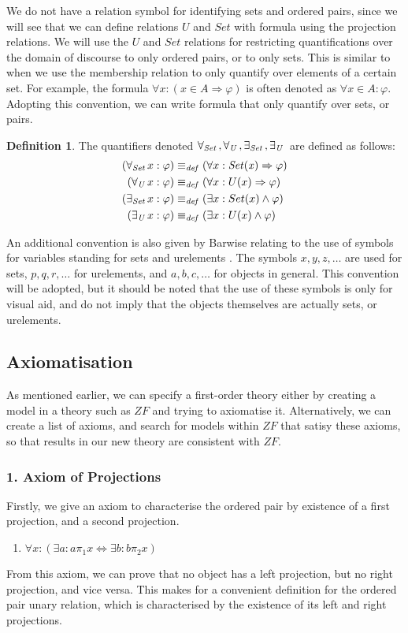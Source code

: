 \documentclass[11pt]{article}
\newcommand{\all}[1]{\forall_{\mathit{#1}}\hspace{0.5mm}}
\newcommand{\ex}[1]{\exists_{\mathit{#1}}\hspace{0.5mm}}
\newcommand{\eqdef}{\equiv_\mathit{def}}
\newcommand{\pleft}{\mathrel{\pi_1}}
\newcommand{\pright}{\mathrel{\pi_2}}
\theoremstyle{definition}
\theoremstyle{theorem}
\theoremstyle{lemma}
\newtheorem{definition}{Definition}[section]
\begin{document}
We do not have a relation symbol for identifying sets and ordered pairs, since we will see that we can define relations $U$ and $\mathit{Set}$ with formula using the projection relations.
We will use the $\mathit{U}$ and $\mathit{Set}$ relations for restricting quantifications over the domain of discourse to only ordered pairs, or to only sets.
This is similar to when we use the membership relation to only quantify over elements of a certain set.
For example, the formula $\forall x: (x\in A \Rightarrow \varphi)$ is often denoted as $\forall x\in A: \varphi$.
Adopting this convention, we can write formula that only quantify over sets, or pairs.
\begin{definition}
The quantifiers denoted $\all{Set}, \all{U}, \ex{Set}, \ex{U}$ are defined as follows:
\begin{align*}
  (\all{Set} x: \varphi) &\eqdef (\forall x: \mathit{Set(x)} \Rightarrow \varphi)\\
  (\all{U} x: \varphi) &\eqdef (\forall x: U(x) \Rightarrow \varphi)\\
  (\ex{Set} x: \varphi) &\eqdef (\exists x: Set(x) \wedge \varphi)\\
  (\ex{U} x: \varphi) &\eqdef (\exists x: U(x) \wedge \varphi)
\end{align*}
\end{definition}
\noindent
An additional convention is also given by Barwise relating to the use of symbols for variables standing for sets and urelements \cite{barwise}.
The symbols $x,y,z,\ldots$ are used for sets, $p,q,r,\ldots$ for urelements, and $a,b,c,\ldots$ for objects in general.
This convention will be adopted, but it should be noted that the use of these symbols is only for visual aid, and do not imply that the objects themselves are actually sets, or urelements.

\subsection{Axiomatisation}
As mentioned earlier, we can specify a first-order theory either by creating a model in a theory such as $\mathit{ZF}$ and trying to axiomatise it.
Alternatively, we can create a list of axioms, and search for models within $\mathit{ZF}$ that satisy these axioms, so that results in our new theory are consistent with $\mathit{ZF}$.
\subsubsection*{1. Axiom of Projections}
Firstly, we give an axiom to characterise the ordered pair by existence of a first projection, and a second projection.
\begin{enumerate}[label=(\roman*)]
\item $\forall x: (\exists a: a\pleft x \Leftrightarrow \exists b: b\pright x)$
\end{enumerate}
From this axiom, we can prove that no object has a left projection, but no right projection, and vice versa.
This makes for a convenient definition for the ordered pair unary relation, which is characterised by the existence of its left and right projections.
\end{document}

